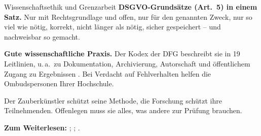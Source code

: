 \begin{handout}{Wissenschaftsethik und Grenzarbeit}
\textbf{DSGVO-Grundsätze (Art.~5) in einem Satz.} Nur mit Rechtsgrundlage
und offen, nur für den genannten Zweck, nur so viel wie nötig, korrekt,
nicht länger als nötig, sicher gespeichert -- und nachweisbar so gemacht.

\textbf{Gute wissenschaftliche Praxis.} Der Kodex der DFG beschreibt sie in
19 Leitlinien, u.\,a.\ zu Dokumentation, Archivierung, Autorschaft und
öffentlichem Zugang zu Ergebnissen \parencite{dfg2019kodex}. Bei Verdacht
auf Fehlverhalten helfen die Ombudspersonen Ihrer Hochschule.

\begin{merkbox}
Der Zauberkünstler schützt seine Methode, die Forschung schützt ihre
Teilnehmenden. Offenlegen muss sie alles, was andere zur Prüfung brauchen.
\end{merkbox}

\textbf{Zum Weiterlesen:} \textcite{dfg2019kodex};
\textcite{merton1973normative}; \textcite{dufourmantelle2021geheimnis}.
\end{handout}

